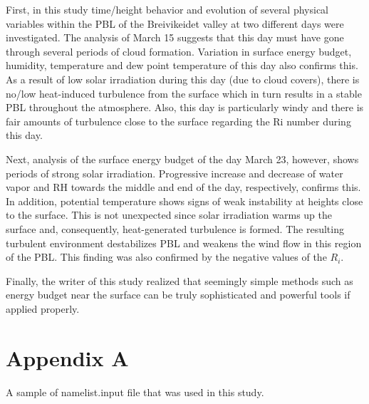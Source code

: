 \documentclass[a4paper,12pt]{article}
\numberwithin{equation}{section} %
\begin{document}
First, in this study time/height behavior and evolution of several physical variables within the PBL of the Breivikeidet valley at two different days were investigated. The analysis of March 15 suggests that this day must have gone through several periods of cloud formation. Variation in surface energy budget, humidity, temperature and dew point temperature of this day also confirms this. As a result of low solar irradiation during this day (due to cloud covers), there is no/low heat-induced turbulence from the surface which in turn results in a stable PBL throughout the atmosphere. Also, this day is particularly windy and there is fair amounts of turbulence close to the surface regarding the Ri number during this day.

Next, analysis of the surface energy budget of the day March 23, however, shows periods of strong solar irradiation. Progressive increase and decrease of water vapor and RH towards the middle and end of the day, respectively, confirms this. In addition, potential temperature shows signs of weak instability at heights close to the surface. This is not unexpected since solar irradiation warms up the surface and, consequently, heat-generated turbulence is formed. The resulting turbulent environment destabilizes PBL and weakens the wind flow in this region of the PBL. This finding was also confirmed by the negative values of the $R_i$.

Finally, the writer of this study realized that seemingly simple methods such as energy budget near the surface can be truly sophisticated and powerful tools if applied properly. 

\newpage

\section{Appendix A}

A sample of namelist.input file that was used in this study. \\

\vspace{0.5cm}
\end{document}
